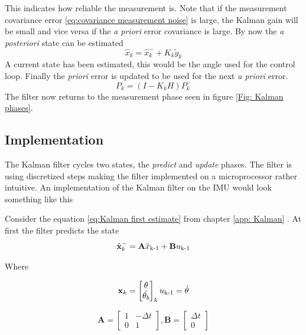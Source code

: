 \documentclass[a4paper,11pt]{kth-mag}
\begin{document}
This indicates how reliable the measurement is. Note that if the measurement covariance error \eqref{eq:covariance measurement noise} is large, the Kalman gain will be small and vice versa if the \textit{a priori} error covariance is large.
By now the \textit{a posteriori} state can be estimated
\begin{equation}
\hat{x}_k = \hat{x}^-_k + K_k\tilde{y}_k
\end{equation}
A current state has been estimated, this would be the angle used for the control loop. Finally the \textit{priori} error is updated to be used for the next \textit{a priori} error.
\begin{equation}
P_k=(I-K_kH)P^-_k
\end{equation} 
The filter now returns to the measurement phase seen in figure \ref{Fig: Kalman phases}.


\subsection{Implementation}
\label{app: Kalman imp}
The Kalman filter cycles two states, the \textit{predict} and \textit{update} phases. The filter is using discretized steps making the filter implemented on a microprocessor rather intuitive. 
An implementation of the Kalman filter on the IMU would look something like this

Consider the equation \eqref{eq:Kalman first estimate} from chapter \ref{app: Kalman} . At first the filter predicts the state
\begin{equation}
\hat{\textbf{x}}^-_k = \textbf{A}\hat{x}\textsubscript{k-1}+\textbf{B}u\textsubscript{k-1}
\end{equation}

Where

\begin{equation}
\textbf{x}_k = \begin{bmatrix}
\theta \\
\dot{\theta_b}
\end{bmatrix}_k
u\textsubscript{k-1} = \dot{\theta}
\end{equation}

\begin{equation}
\textbf{A} = \begin{bmatrix}
1  & -\Delta t \\
0   & 1
\end{bmatrix}
,
\textbf{B} = \begin{bmatrix}
\Delta t \\ 0
\end{bmatrix}
\end{equation}
\end{document}
